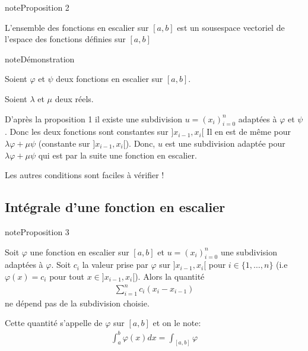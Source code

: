 \documentclass[letterpaper,10pt,french]{jupyterBook}
\begin{document}
\begin{sphinxadmonition}{note}{Proposition 2}

\sphinxAtStartPar
L’ensemble des fonctions en escalier sur \([a, b]\) est un sous\sphinxhyphen{}espace vectoriel de l’espace des fonctions définies sur \([a, b]\)
\end{sphinxadmonition}

\begin{sphinxadmonition}{note}{Démonstration}

\sphinxAtStartPar
Soient \(\varphi\) et \(\psi\) deux fonctions en escalier sur \([a, b]\).

\sphinxAtStartPar
Soient \(\lambda\) et \(\mu\) deux réels.

\sphinxAtStartPar
D’après la proposition 1 il existe une subdivision \(u=(x_i)_{i=0}^n\) adaptées à \(\varphi\) et \(\psi\).
Donc les deux fonctions sont constantes sur \(]x_{i-1}, x_{i}[\)
Il en est de même pour \(\lambda \varphi + \mu \psi\) (constante sur \(]x_{i-1}, x_{i}[\)).
Donc, \(u\) est une subdivision adaptée pour \(\lambda \varphi + \mu \psi\) qui est par la suite une fonction en escalier.

\sphinxAtStartPar
Les autres conditions sont faciles à vérifier !
\end{sphinxadmonition}


\subsection{Intégrale d’une fonction en escalier}
\label{\detokenize{fe:integrale-d-une-fonction-en-escalier}}
\begin{sphinxadmonition}{note}{Proposition 3}

\sphinxAtStartPar
Soit \(\varphi\) une fonction en escalier sur \([a, b]\) et \(u=(x_i)_{i=0}^n\) une subdivision  adaptées à \(\varphi\). Soit \(c_i\) la valeur prise par \(\varphi\) sur \(]x_{i-1}, x_i[\) pour \(i \in \{1, \ldots, n\}\) (i.e \(\varphi(x)=c_i\) pour tout \(x \in ]x_{i-1}, x_i[\)). Alors la quantité
\begin{equation*}
\begin{split}
\sum_{i=1}^nc_i(x_i-x_{i-1})
\end{split}
\end{equation*}
\sphinxAtStartPar
ne dépend pas de la subdivision choisie.

\sphinxAtStartPar
Cette quantité s’appelle  de \(\varphi\) sur  \([a, b]\) et on le note:
\begin{equation*}
\begin{split}
\int_a^b \varphi(x)dx=\int_{[a, b]}\varphi
\end{split}
\end{equation*}\end{sphinxadmonition}
\end{document}
